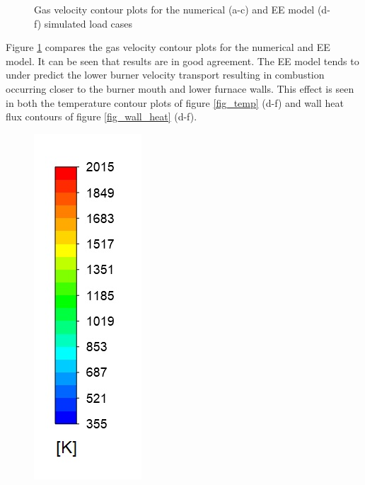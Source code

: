 \documentclass{webofc}
\begin{document}
\begin{figure}[h!]
\setlength{\belowcaptionskip}{0pt}
\caption{Gas velocity contour plots for the numerical (a-c) and EE model (d-f) simulated load cases}
\label{fig_velocity}
\end{figure}

Figure \ref{fig_velocity} compares the gas velocity contour plots for the numerical and EE model. It can be seen that results are in good agreement. The EE model tends to under predict the lower burner velocity transport resulting in combustion occurring closer to the burner mouth and lower furnace walls. This effect is seen in both the temperature contour plots of figure \ref{fig_temp} (d-f) and wall heat flux contours of figure \ref{fig_wall_heat} (d-f).
\begin{figure}[h!]
\centering
\includegraphics[scale = 0.3]{temp} 

\end{figure}
\end{document}
